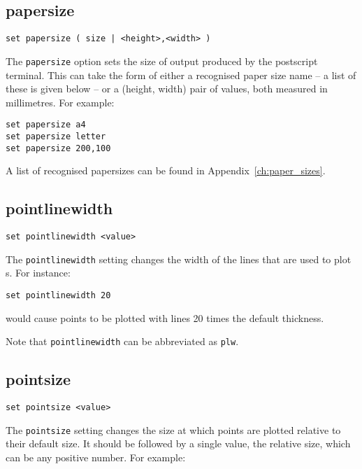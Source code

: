 \subsection{papersize}

\begin{verbatim}
set papersize ( size | <height>,<width> )
\end{verbatim}

The {\tt papersize} option sets the size of output produced by the postscript
terminal. This can take the form of either a recognised paper size name -- a
list of these is given below -- or a (height, width) pair of values, both measured
in millimetres. For example:

\begin{verbatim}
set papersize a4
set papersize letter
set papersize 200,100
\end{verbatim}

A list of recognised papersizes can be found in Appendix~\ref{ch:paper_sizes}.

\subsection{pointlinewidth}

\begin{verbatim}
set pointlinewidth <value>
\end{verbatim}

The {\tt pointlinewidth} setting changes the width of the lines that are used to
plot \datapoint s.  For instance:

\begin{verbatim}
set pointlinewidth 20
\end{verbatim}

\noindent would cause points to be plotted with lines 20 times the default thickness.

Note that {\tt pointlinewidth} can be abbreviated as {\tt plw}.

\subsection{pointsize}

\begin{verbatim}
set pointsize <value>
\end{verbatim}

The {\tt pointsize} setting changes the size at which points are plotted
relative to their default size. It should be followed by a single value, the
relative size, which can be any positive number. For example:


